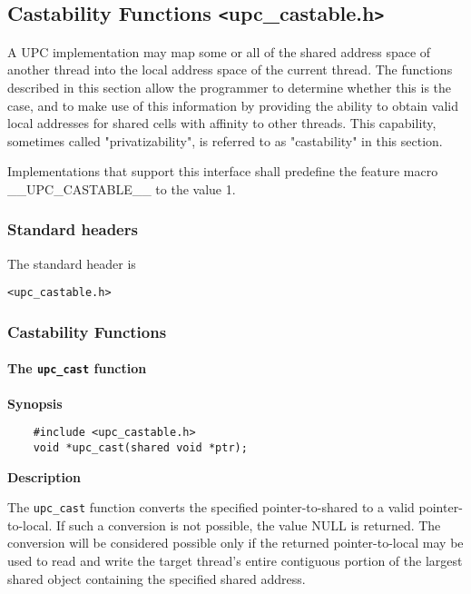 \subsection{Castability Functions \texttt{<}upc\_castable.h\texttt{>}}
\label{upc-castable}

\npf A UPC implementation may map some or all of the shared address space
of another thread into the local address space of the current thread.  The
functions described in this section allow the programmer to determine
whether this is the case, and to make use of this information by
providing the ability to obtain valid local addresses for shared cells
with affinity to other threads.  This capability, sometimes called
"privatizability", is referred to as "castability" in this section.

\np Implementations that support this interface shall predefine the
feature macro {\_\_UPC\_CASTABLE\_\_} to the value 1.

\subsubsection{Standard headers}

\npf The standard header is

{\tt <upc\_castable.h>}

\subsubsection{Castability Functions}

\paragraph{The {\tt upc\_cast} function}

{\bf Synopsis}

\npf\vspace{-2.5em}
\begin{verbatim}
    #include <upc_castable.h>
    void *upc_cast(shared void *ptr);
\end{verbatim}

{\bf Description}

\np The {\tt upc\_cast} function converts the specified
pointer-to-shared to a valid pointer-to-local.  If such a conversion
is not possible, the value NULL is returned.  The conversion will be considered possible only if the returned
pointer-to-local may be used to read and write the target thread's
entire contiguous portion of the largest shared object
containing the specified shared address.


